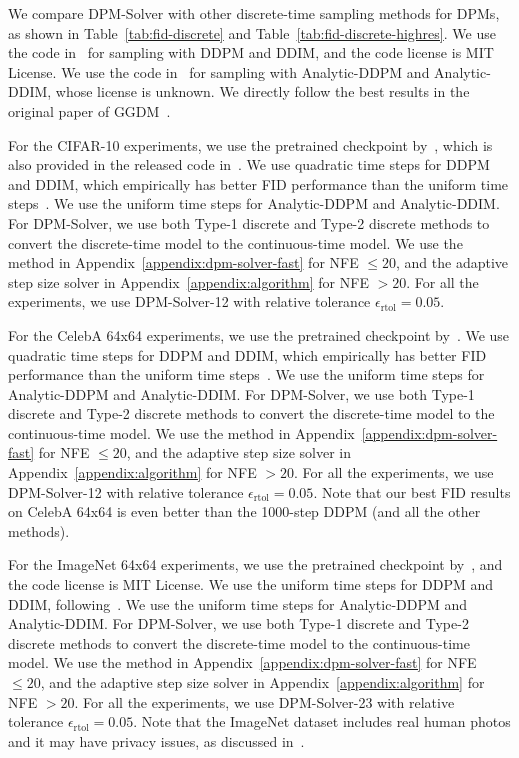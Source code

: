 We compare DPM-Solver with other discrete-time sampling methods for DPMs, as shown in Table~\ref{tab:fid-discrete} and Table~\ref{tab:fid-discrete-highres}. We use the code in~\citep{song2020denoising} for sampling with DDPM and DDIM, and the code license is MIT License. We use the code in~\citep{bao2022analytic} for sampling with Analytic-DDPM and Analytic-DDIM, whose 
license is unknown. We directly follow the best results in the original paper of GGDM~\citep{watson2021learning}.

For the CIFAR-10 experiments, we use the pretrained checkpoint by~\citep{ho2020denoising}, which is also provided in the released code in~\citep{song2020denoising}. We use quadratic time steps for DDPM and DDIM, which empirically has better FID performance than the uniform time steps~\citep{song2020denoising}. We use the uniform time steps for Analytic-DDPM and Analytic-DDIM. For DPM-Solver, we use both Type-1 discrete and Type-2 discrete methods to convert the discrete-time model to the continuous-time model. We use the method in Appendix~\ref{appendix:dpm-solver-fast} for NFE $\leq 20$, and the adaptive step size solver in Appendix~\ref{appendix:algorithm} for NFE $> 20$. For all the experiments, we use DPM-Solver-12 with relative tolerance $\epsilon_{\text{rtol}}=0.05$.

For the CelebA 64x64 experiments, we use the pretrained checkpoint by~\citep{song2020denoising}. We use quadratic time steps for DDPM and DDIM, which empirically has better FID performance than the uniform time steps~\citep{song2020denoising}. We use the uniform time steps for Analytic-DDPM and Analytic-DDIM. For DPM-Solver, we use both Type-1 discrete and Type-2 discrete methods to convert the discrete-time model to the continuous-time model. We use the method in Appendix~\ref{appendix:dpm-solver-fast} for NFE $\leq 20$, and the adaptive step size solver in Appendix~\ref{appendix:algorithm} for NFE $> 20$. For all the experiments, we use DPM-Solver-12 with relative tolerance $\epsilon_{\text{rtol}}=0.05$. Note that our best FID results on CelebA 64x64 is even better than the 1000-step DDPM (and all the other methods).

For the ImageNet 64x64 experiments, we use the pretrained checkpoint by~\citep{nichol2021improved}, and the code license is MIT License. We use the uniform time steps for DDPM and DDIM, following~\citep{song2020denoising}. We use the uniform time steps for Analytic-DDPM and Analytic-DDIM. For DPM-Solver, we use both Type-1 discrete and Type-2 discrete methods to convert the discrete-time model to the continuous-time model. We use the method in Appendix~\ref{appendix:dpm-solver-fast} for NFE $\leq 20$, and the adaptive step size solver in Appendix~\ref{appendix:algorithm} for NFE $> 20$. For all the experiments, we use DPM-Solver-23 with relative tolerance $\epsilon_{\text{rtol}}=0.05$. Note that the ImageNet dataset includes real human photos and it may have privacy issues, as discussed in~\citep{yang2021study}.

